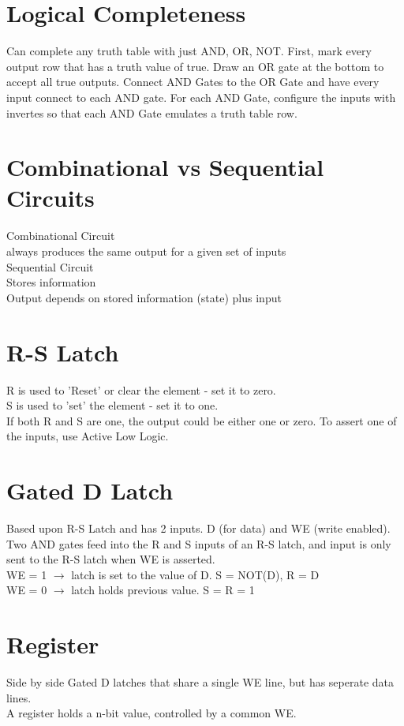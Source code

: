 \documentclass{article}
\begin{document}
\section{Logical Completeness}
Can complete any truth table with just AND, OR, NOT. First, mark every output row that has a truth value of true. Draw an OR gate at the bottom to accept all true outputs. Connect AND Gates to the OR Gate and have every input connect to each AND gate. For each AND Gate, configure the inputs with invertes so that each AND Gate emulates a truth table row.

\section{Combinational vs Sequential Circuits}
Combinational Circuit\\
always produces the same output for a given set of inputs\\
Sequential Circuit\\
Stores information\\
Output depends on stored information (state) plus input

\section{R-S Latch}
R is used to 'Reset' or clear the element - set it to zero.\\
S is used to 'set' the element - set it to one.\\
If both R and S are one, the output could be either one or zero. To assert one of the inputs, use Active Low Logic.\\

\section{Gated D Latch}
Based upon R-S Latch and has 2 inputs. D (for data) and WE (write enabled). Two AND gates feed into the R and S inputs of an R-S latch, and input is only sent to the R-S latch when WE is asserted.\\
WE = 1 $\to$ latch is set to the value of D. S = NOT(D), R = D\\
WE = 0 $\to$ latch holds previous value. S = R = 1\\

\section{Register}
Side by side Gated D latches that share a single WE line, but has seperate data lines.\\
A register holds a n-bit value, controlled by a common WE.\\
\end{document}
